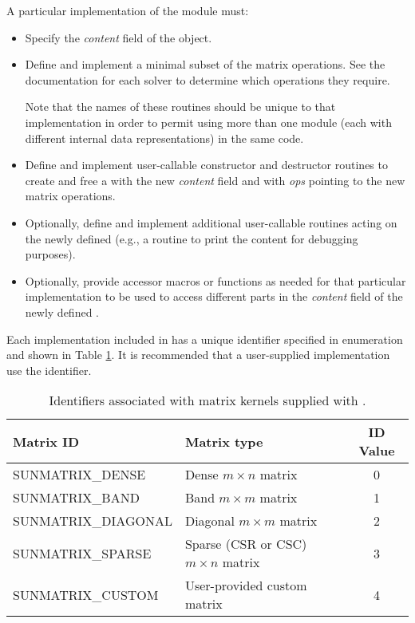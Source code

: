 A particular implementation of the {\sunmatrix} module must:
\begin{itemize}
\item Specify the {\em content} field of the  object.
\item Define and implement a minimal subset of the matrix operations.
  See the documentation for each {\sundials} solver to determine which
  {\sunmatrix} operations they require.

  Note that the names of these routines should be unique to that
  implementation in order to permit using more than one {\sunmatrix}
  module (each with different  internal data
  representations) in the same code. 
\item Define and implement user-callable constructor and destructor
  routines to create and free a  with
  the new {\em content} field and with {\em ops} pointing to the
  new matrix operations.
\item Optionally, define and implement additional user-callable routines
  acting on the newly defined  (e.g., a routine to print
  the content for debugging purposes).
\item Optionally, provide accessor macros or functions as needed for
  that particular implementation to be used to access different parts
  in the {\em content} field of the newly defined . 
\end{itemize}

Each {\sunmatrix} implementation included in {\sundials} has a unique 
identifier specified in enumeration and shown in Table \ref{t:matrixIDs}.
It is recommended that a user-supplied {\sunmatrix} implementation use the 
 identifier.

\begin{table}
\centering
\caption{Identifiers associated with matrix kernels supplied with {\sundials}.}
\label{t:matrixIDs}
\medskip
\begin{tabular}{|l|l|c|}
\hline
{\bf Matrix ID} & {\bf Matrix type} & {\bf ID Value} \\
\hline
SUNMATRIX\_DENSE      & Dense $m\times n$ matrix               & 0 \\ 
SUNMATRIX\_BAND       & Band $m\times m$ matrix                & 1 \\
SUNMATRIX\_DIAGONAL   & Diagonal $m\times m$ matrix            & 2 \\
SUNMATRIX\_SPARSE     & Sparse (CSR or CSC) $m\times n$ matrix & 3 \\ 
SUNMATRIX\_CUSTOM     & User-provided custom matrix            & 4 \\
\hline
\end{tabular}
\end{table}

